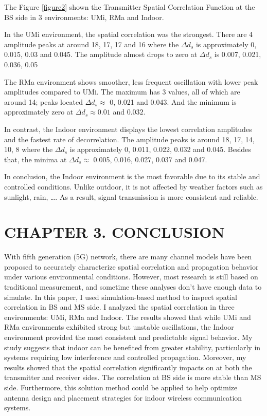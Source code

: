 \documentclass{article} %
\begin{document}
The Figure \ref{figure2} shown the Transmitter Spatial Correlation Function at the BS side in 3 environments: UMi, RMa and Indoor. 

In the UMi environment, the spatial correlation was the strongest. There are 4 amplitude peaks at around 18, 17, 17 and 16 where the $\Delta d_s$ is approximately 0, 0.015, 0.03 and 0.045. The amplitude almost drops to zero at $\Delta d_s$ is 0.007, 0.021, 0.036, 0.05

The RMa environment shows smoother, less frequent oscillation with lower peak amplitudes compared to UMi. The maximum has 3 values, all of which are around 14; peaks located $\Delta d_s \approx$ 0, 0.021 and 0.043. And the minimum is approximately zero at $\Delta d_s \approx 0.01$ and $0.032$.

In contrast, the Indoor environment displays the lowest correlation amplitudes and the fastest rate of decorrelation. The amplitude peaks is around 18, 17, 14, 10, 8 where the $\Delta d_s$ is approximately 0, 0.011, 0.022, 0.032 and 0.045. Besides that, the minima at $\Delta d_s \approx$ 0.005, 0.016, 0.027, 0.037 and 0.047.

In conclusion, the Indoor environment is the most favorable due to its stable and controlled conditions. Unlike outdoor, it is not affected by weather factors such as sunlight, rain, \dots. As a result, signal transmission is more consistent and reliable.

\clearpage

\section*{CHAPTER 3. CONCLUSION}
With fifth generation (5G) network, there are many channel models have been proposed to accurately characterize spatial correlation and propagation behavior under various environmental conditions. However, most research is still based on traditional measurement, and sometime these analyses don’t have enough data to simulate. In this paper, I used simulation-based method to inspect spatial correlation in BS and MS side. I  analyzed the spatial correlation in three environments: UMi, RMa and Indoor. The results showed that while UMi and RMa environments exhibited strong but unstable oscillations, the Indoor environment provided the most consistent and predictable signal behavior. My study suggests that indoor can be benefited from greater stability, particularly in systems requiring low interference and controlled propagation.  Moreover, my results showed that the spatial correlation significantly impacts on at both the transmitter and receiver sides. The correlation at BS side is more stable than MS side.  Furthermore, this solution method could be applied to help optimize antenna design and placement strategies for indoor wireless communication systems.
\end{document}
